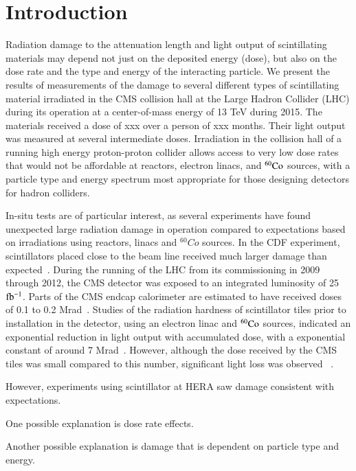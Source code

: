 \documentclass[review]{elsarticle}
\begin{document}
\section{Introduction}
\label{sec:Introduction}
Radiation damage to the attenuation length and light output
of scintillating materials may depend not just on the deposited energy (dose),
but also on the dose rate and the type and energy of the interacting particle.
We present the
results of measurements of the damage to several different types
of scintillating material irradiated in the CMS collision hall at the Large Hadron Collider (LHC) during its operation at a center-of-mass energy
of 13 TeV during 2015.
The materials received a dose of {\color{red} xxx} over a person of {\color{red} xxx} months.  Their light output was measured at several intermediate doses.
Irradiation in the collision hall of a running high energy
proton-proton collider allows access to very low dose rates that
would not be affordable at reactors, electron linacs,
and ${\rm ^{60}Co}$ sources, with a particle type and energy
spectrum most appropriate for those designing detectors for hadron colliders.


In-situ tests are of particular interest, as several experiments
have found unexpected large radiation damage in operation
compared to expectations
based on irradiations using reactors, linacs and ${^{60}Co}$ sources.
In the CDF experiment, scintillators placed close to the
beam line received much larger damage than expected~\cite{Giokaris1993315}.
During the running of the LHC from its commissioning in 2009
through 2012, the CMS
detector was exposed to an integrated luminosity of 25 ${\rm fb^{-1}}$.  Parts of the
CMS endcap calorimeter are estimated to have received doses of 0.1 to 0.2 Mrad~\cite{ecfa2015}.
Studies of the radiation hardness of scintillator tiles
prior to installation in the detector,
using an electron linac and ${\rm ^{60}Co}$ sources,
indicated an exponential reduction in 
light output with accumulated dose, with a exponential constant of 
around 7 Mrad~\cite{vasken,ByonWagner1993263}.  
However, although the dose received by the CMS tiles was
small compared to this number,
significant light loss was observed ~\cite{phaseiitdr}.


However, experiments using scintillator at HERA saw damage
consistent with expectations.

One possible explanation is dose rate effects.

Another possible explanation is damage that is dependent on particle
type and energy.
\end{document}
